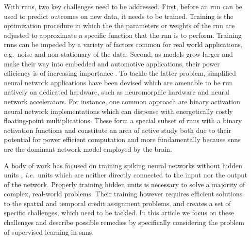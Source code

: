 \documentclass[journal,onecolumn,11pt]{IEEEtran}
\begin{document}
With \glspl{rnn}, two key challenges need to be addressed. 
First, before an \gls{rnn} can be used to predict outcomes on new data, it needs to be trained.
Training is the optimization procedure in which the the parameters or weights of the \gls{rnn} are adjusted to approximate a specific function that the \gls{rnn} is to perform.
Training \glspl{rnn} can be impeded by a variety of factors common for real world applications, e.g.\ noise and non-stationary of the data. 
Second, as models grow larger and make their way into embedded and automotive applications, their power efficiency is of increasing importance \cite{boahen_neuromorphs_2017}. 
To tackle the latter problem, simplified neural network applications have been devised which are amenable to be run natively on dedicated hardware, such as neuromorphic hardware and neural network accelerators.  
For instance, one common approach are binary activation neural network implementations which can dispense with energetically costly floating-point multiplications. %
These form a special subset of \glspl{rnn} with a binary activation functions and constitute an area of active study both due to their potential for power
efficient computation and more fundamentally because \glspl{snn} are the dominant network model employed by the brain.

A body of work has focused on training spiking neural networks without hidden units \cite{ponulak_supervised_2009, Gutig_Sompolinsky06_tempneur,
florian_chronotron:_2012, mohemmed_span:_2012, memmesheimer_learning_2014, Anwani_Rajendran15_normappr}, \emph{i.e.}\ units which are neither directly connected to the input nor the output of the network.  
Properly training hidden units is necessary to solve a majority of complex, real-world problems.
Their training however requires efficient solutions to the spatial and temporal credit assignment problems, and creates a set of specific challenges, which need to be tackled.  
In this article we focus on these challenges and describe possible remedies by specifically considering the problem of supervised learning in \glspl{snn}.
\end{document}
